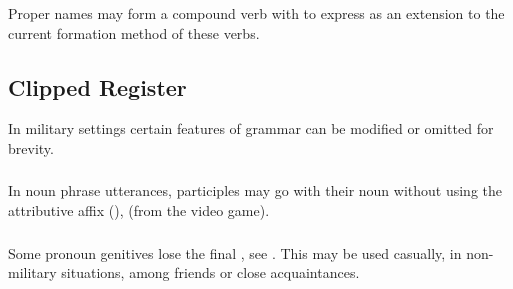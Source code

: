 \subsubsection{}Proper names may form a compound verb with  to
express  as an extension to the current formation method of
these verbs.


\subsection{Clipped Register} In military settings certain features of
grammar can be modified or omitted for brevity.

\subsubsection{} In noun phrase utterances, participles may go with
their noun without using the attri\-bu\-tive affix 
(),   (from
the video game).

\subsubsection{} Some pronoun genitives lose the final , see
.  This may be used casually, in
non-military situations, among friends or close acquaintances.

